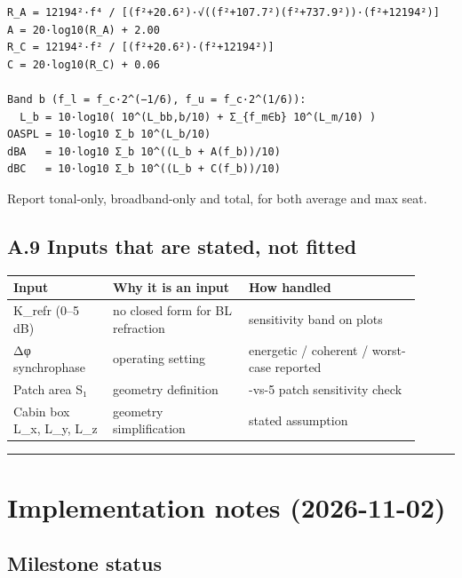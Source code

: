 \documentclass[10pt,a4paper]{article}
\begin{document}
\begin{Verbatim}[breaklines,fontsize=\small,frame=single,rulecolor=\color{gray}]
R_A = 12194²·f⁴ / [(f²+20.6²)·√((f²+107.7²)(f²+737.9²))·(f²+12194²)]    A = 20·log10(R_A) + 2.00
R_C = 12194²·f² / [(f²+20.6²)·(f²+12194²)]                              C = 20·log10(R_C) + 0.06

Band b (f_l = f_c·2^(−1/6), f_u = f_c·2^(1/6)):
  L_b = 10·log10( 10^(L_bb,b/10) + Σ_{f_m∈b} 10^(L_m/10) )
OASPL = 10·log10 Σ_b 10^(L_b/10)
dBA   = 10·log10 Σ_b 10^((L_b + A(f_b))/10)
dBC   = 10·log10 Σ_b 10^((L_b + C(f_b))/10)
\end{Verbatim}

Report tonal-only, broadband-only and total, for both average and max seat.

\subsection*{A.9 Inputs that are stated, not fitted}

{\small
\begin{longtable}{>{\raggedright\arraybackslash}p{0.225\linewidth}>{\raggedright\arraybackslash}p{0.301\linewidth}>{\raggedright\arraybackslash}p{0.384\linewidth}}
\hline
\textbf{Input} & \textbf{Why it is an input} & \textbf{How handled} \\
\hline
\endhead
K\_refr (0–5 dB) & no closed form for BL refraction & sensitivity band on plots \\
Δφ synchrophase & operating setting & energetic / coherent / worst-case reported \\
Patch area S₁ & geometry definition & 1-vs-5 patch sensitivity check \\
Cabin box L\_x, L\_y, L\_z & geometry simplification & stated assumption \\
\hline
\end{longtable}}

\noindent\rule{\linewidth}{0.4pt}

\section*{Implementation notes (2026-11-02)}

\subsection*{Milestone status}
\end{document}
